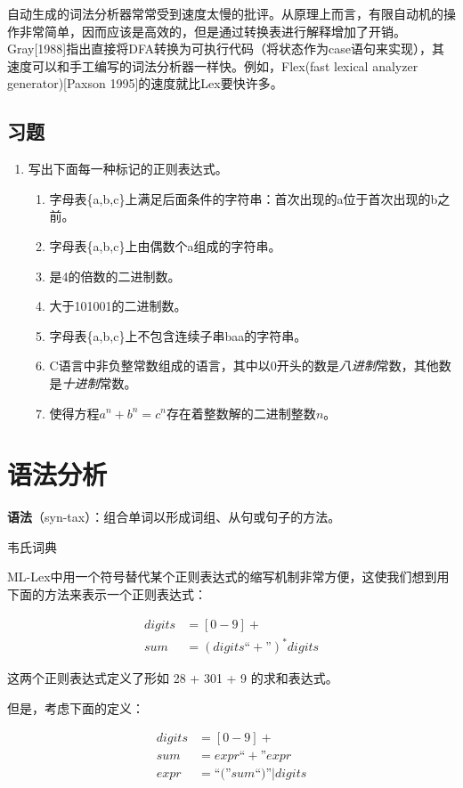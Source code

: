 \documentclass[cn,11pt,chinese]{elegantbook}
\begin{document}
自动生成的词法分析器常常受到速度太慢的批评。从原理上而言，有限自动机的操作非常简单，因而应该是高效的，但是通过转换表进行解释增加了开销。Gray[1988]指出直接将DFA转换为可执行代码（将状态作为case语句来实现），其速度可以和手工编写的词法分析器一样快。例如，Flex(fast lexical analyzer generator)[Paxson 1995]的速度就比Lex要快许多。

\section{习题}

\begin{enumerate}
  \item 写出下面每一种标记的正则表达式。
  \begin{enumerate}
    \item 字母表\{a,b,c\}上满足后面条件的字符串：首次出现的a位于首次出现的b之前。
    \item 字母表\{a,b,c\}上由偶数个a组成的字符串。
    \item 是4的倍数的二进制数。
    \item 大于101001的二进制数。
    \item 字母表\{a,b,c\}上不包含连续子串baa的字符串。
    \item C语言中非负整常数组成的语言，其中以0开头的数是\textit{八进制}常数，其他数是\textit{十进制}常数。
    \item 使得方程$a^n+b^n=c^n$存在着整数解的二进制整数$n$。
  \end{enumerate}
\end{enumerate}

\chapter{语法分析}

\epigraph{\textbf{语法}（syn-tax）：组合单词以形成词组、从句或句子的方法。}{韦氏词典}

ML-Lex中用一个符号替代某个正则表达式的缩写机制非常方便，这使我们想到用下面的方法来表示一个正则表达式：

\begin{align*}
digits &= [0-9]+ \\
sum &= (digits\text{``}+\text{''})^*digits
\end{align*}

这两个正则表达式定义了形如 28 + 301 + 9 的求和表达式。

但是，考虑下面的定义：

\begin{align*}
digits &= [0-9]+ \\
sum &= expr\text{``}+\text{''}expr \\
expr &= \text{``(''}sum\text{``)''}|digits
\end{align*}
\end{document}
